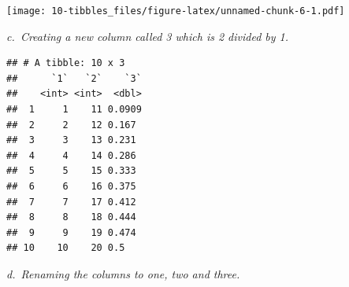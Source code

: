 \documentclass[]{book}
\newenvironment{Shaded}{\begin{snugshade}}{\end{snugshade}}
\newcommand{\DataTypeTok}[1]{\textcolor[rgb]{0.13,0.29,0.53}{#1}}
\newcommand{\KeywordTok}[1]{\textcolor[rgb]{0.13,0.29,0.53}{\textbf{#1}}}
\newcommand{\NormalTok}[1]{#1}
\newcommand{\OperatorTok}[1]{\textcolor[rgb]{0.81,0.36,0.00}{\textbf{#1}}}
\newcommand{\StringTok}[1]{\textcolor[rgb]{0.31,0.60,0.02}{#1}}
\theoremstyle{definition}
\theoremstyle{definition}
\theoremstyle{definition}
\theoremstyle{remark}
\begin{document}
\begin{Shaded}
\end{Shaded}

\texttt{[image: 10-tibbles\_files/figure-latex/unnamed-chunk-6-1.pdf]}

\emph{c.~Creating a new column called 3 which is 2 divided by 1.}

\begin{Shaded}
\end{Shaded}

\begin{verbatim}
## # A tibble: 10 x 3
##      `1`   `2`    `3`
##    <int> <int>  <dbl>
##  1     1    11 0.0909
##  2     2    12 0.167 
##  3     3    13 0.231 
##  4     4    14 0.286 
##  5     5    15 0.333 
##  6     6    16 0.375 
##  7     7    17 0.412 
##  8     8    18 0.444 
##  9     9    19 0.474 
## 10    10    20 0.5
\end{verbatim}

\emph{d.~Renaming the columns to one, two and three.}

\begin{Shaded}
\end{Shaded}
\end{document}
